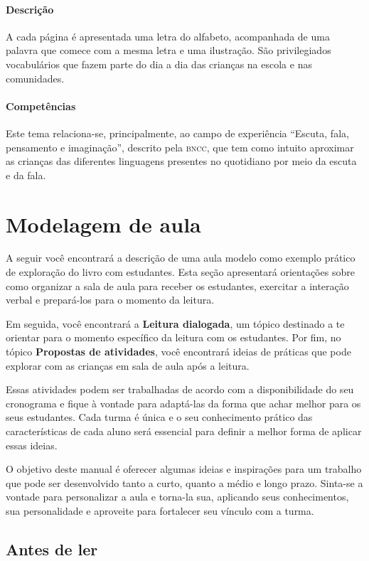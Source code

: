 \documentclass[11pt]{extarticle}
\begin{document}
\paragraph{Descrição} 
A cada página é apresentada uma letra do alfabeto, acompanhada de uma palavra
que comece com a mesma letra e uma ilustração. São privilegiados
vocabulários que fazem parte do dia a dia das crianças na escola e nas
comunidades. 
\paragraph{Competências} 
Este tema relaciona-se, principalmente, ao campo de experiência 
``Escuta, fala, pensamento e imaginação'', descrito pela \textsc{bncc}, 
que tem como intuito aproximar as crianças das diferentes linguagens 
presentes no quotidiano por meio da escuta e da fala.

\section{Modelagem de aula}
A seguir você encontrará a descrição de uma aula modelo como exemplo 
prático de exploração do livro com estudantes. Esta seção apresentará 
orientações sobre como organizar a sala de aula para receber os 
estudantes, exercitar a interação verbal e prepará-los para o 
momento da leitura.

Em seguida, você encontrará a \textbf{Leitura dialogada}, um 
tópico destinado a te orientar para o momento específico da 
leitura com os estudantes. Por fim, no tópico 
\textbf{Propostas de atividades}, você encontrará ideias 
de práticas que pode explorar com as crianças em sala de 
aula após a leitura. 

Essas atividades podem ser trabalhadas de acordo com a 
disponibilidade do seu cronograma e fique à vontade para adaptá-las 
da forma que achar melhor para os seus estudantes. Cada turma é única 
e o seu conhecimento prático das características de cada aluno será 
essencial para definir a melhor forma de aplicar essas ideias. 

O objetivo deste manual é oferecer algumas ideias 
e inspirações para um trabalho que pode ser desenvolvido tanto 
a curto, quanto a médio e longo prazo. Sinta-se a vontade para 
personalizar a aula e torna-la sua, aplicando seus conhecimentos, sua 
personalidade e aproveite para fortalecer 
seu vínculo com a turma.


\subsection{Antes de ler}
\end{document}
